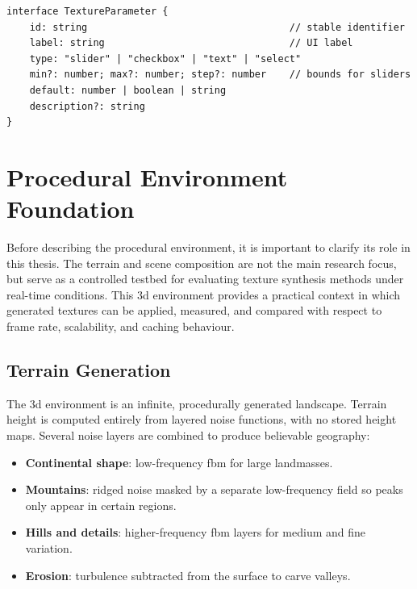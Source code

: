 \begin{lstlisting}[style=defaultcode, caption={The actual TextureParameter interface from the source.}, label={lst:textureparam-interface}]
interface TextureParameter {
    id: string                                   // stable identifier
    label: string                                // UI label
    type: "slider" | "checkbox" | "text" | "select"
    min?: number; max?: number; step?: number    // bounds for sliders
    default: number | boolean | string
    description?: string
}
\end{lstlisting}

\section{Procedural Environment Foundation}

Before describing the procedural environment, it is important to clarify its role in this thesis. The terrain and scene composition are not the main research focus, but serve as a controlled testbed for evaluating texture synthesis methods under real-time conditions. This \gls{3d} environment provides a practical context in which generated textures can be applied, measured, and compared with respect to frame rate, scalability, and caching behaviour.

\subsection{Terrain Generation}

The \gls{3d} environment is an infinite, procedurally generated landscape. Terrain height is computed entirely from layered noise functions, with no stored height maps. Several noise layers are combined to produce believable geography:

\begin{itemize}[noitemsep, topsep=0pt]
    \item \textbf{Continental shape}: low-frequency \gls{fbm} for large landmasses.
    \item \textbf{Mountains}: ridged noise masked by a separate low-frequency field so peaks only appear in certain regions.
    \item \textbf{Hills and details}: higher-frequency \gls{fbm} layers for medium and fine variation.
    \item \textbf{Erosion}: turbulence subtracted from the surface to carve valleys.
\end{itemize}

